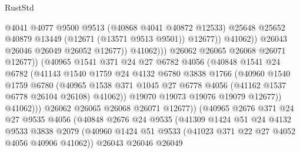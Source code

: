 \begin{lexlean}{RustStd}
\begin{coremodule}
                                      @4041
                                      @4077
                                      @9500
                                      @9513
                                      (@40868 @4041 @40872 @12533)
                                      @25648
                                      @25652
                                      @40879
                                      @13449
                                      (@12671 (@13571 @9513 @9501))
                                      @12677))
                                  @41062))
                              @26043
                              @26046
                              @26049
                              @26052
                              @12677))
                          @41062)))
                    @26062
                    @26065
                    @26068
                    @26071
                    @12677))
                (@40965
                  @1541
                  @371
                  @24
                  @27
                  @6782
                  @4056
                  (@40848
                    @1541
                    @24
                    @6782
                    (@41143
                      @1540
                      @1759
                      @24
                      @4132
                      @6780
                      @3838
                      @1766
                      (@40960
                        @1540
                        @1759
                        @6780
                        (@40965
                          @1538
                          @371
                          @1045
                          @27
                          @6778
                          @4056
                          (@41162 @1537 @6778 @26104 @26108)
                          @41062))
                      @19070
                      @19073
                      @19076
                      @19079
                      @12677))
                  @41062)))
            @26062
            @26065
            @26068
            @26071
            @12677))
        (@40965
          @2676
          @371
          @24
          @27
          @9535
          @4056
          (@40848
            @2676
            @24
            @9535
            (@41309
              @1424
              @51
              @24
              @4132
              @9533
              @3838
              @2079
              (@40960 @1424 @51 @9533 (@41023 @371 @22 @27 @4052 @4056 @40906 @41062))
              @26043
              @26046
              @26049

\end{coremodule}
\end{lexlean}
